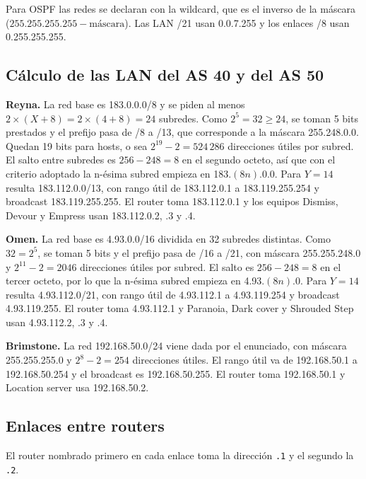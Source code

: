 Para OSPF las redes se declaran con la wildcard, que es el inverso de la máscara ($255.255.255.255 - \text{máscara}$). Las LAN /21 usan 0.0.7.255 y los enlaces /8 usan 0.255.255.255.

\subsection{Cálculo de las LAN del AS 40 y del AS 50}

\textbf{Reyna.} La red base es 183.0.0.0/8 y se piden al menos $2\times(X+8)=2\times(4+8)=24$ subredes. Como $2^5=32\geq 24$, se toman 5 bits prestados y el prefijo pasa de /8 a /13, que corresponde a la máscara 255.248.0.0. Quedan 19 bits para hosts, o sea $2^{19}-2=524\,286$ direcciones útiles por subred. El salto entre subredes es $256-248=8$ en el segundo octeto, así que con el criterio adoptado la n-ésima subred empieza en 183.$(8n)$.0.0. Para $Y=14$ resulta 183.112.0.0/13, con rango útil de 183.112.0.1 a 183.119.255.254 y broadcast 183.119.255.255. El router toma 183.112.0.1 y los equipos Dismiss, Devour y Empress usan 183.112.0.2, .3 y .4.

\textbf{Omen.} La red base es 4.93.0.0/16 dividida en 32 subredes distintas. Como $32=2^5$, se toman 5 bits y el prefijo pasa de /16 a /21, con máscara 255.255.248.0 y $2^{11}-2=2046$ direcciones útiles por subred. El salto es $256-248=8$ en el tercer octeto, por lo que la n-ésima subred empieza en 4.93.$(8n)$.0. Para $Y=14$ resulta 4.93.112.0/21, con rango útil de 4.93.112.1 a 4.93.119.254 y broadcast 4.93.119.255. El router toma 4.93.112.1 y Paranoia, Dark cover y Shrouded Step usan 4.93.112.2, .3 y .4.

\textbf{Brimstone.} La red 192.168.50.0/24 viene dada por el enunciado, con máscara 255.255.255.0 y $2^{8}-2=254$ direcciones útiles. El rango útil va de 192.168.50.1 a 192.168.50.254 y el broadcast es 192.168.50.255. El router toma 192.168.50.1 y Location server usa 192.168.50.2.

\subsection{Enlaces entre routers}

El router nombrado primero en cada enlace toma la dirección \texttt{.1} y el segundo la \texttt{.2}.

{\footnotesize\setlength{\tabcolsep}{3pt}

}
